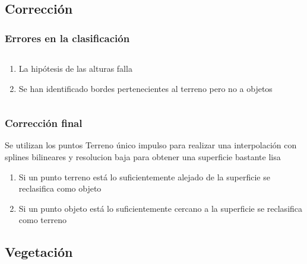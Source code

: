 \subsection{Corrección}
\begin{frame}
  \frametitle{Errores en la clasificación}
  \begin{columns}
    \begin{column}{0.5\textwidth}
     \begin{enumerate}
    	\item<1-> La hipótesis de las alturas falla
    	\item<2-> Se han identificado bordes pertenecientes al terreno pero no a objetos
     \end{enumerate}
    \end{column}
   \begin{column}{0.45\textwidth}
   \begin{center}
   \end{center}%
   \end{column}
  \end{columns}
\end{frame}
\begin{frame}
  \frametitle{Corrección final}

Se utilizan los puntos \alert<1>{Terreno único impulso} para realizar una interpolación con splines bilineares y resolucion baja para obtener una superficie bastante lisa
\begin{enumerate}
 \item<2-> Si un punto terreno está lo suficientemente alejado de la superficie se reclasifica como \alert<2>{objeto}
 \item<3-> Si un punto objeto está lo suficientemente cercano a la superficie se reclasifica como \alert<3>{terreno}
\end{enumerate}
\end{frame}
\subsection{Vegetación}
\begin{frame}
 
\end{frame}
